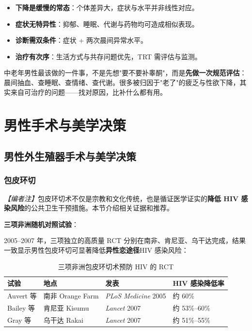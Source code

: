 \documentclass[12pt,a4paper,twoside]{ctexbook}
\newcommand{\keyword}[1]{\textbf{#1}}
\begin{document}
\begin{itemize}
  \item \keyword{下降是缓慢的常态}：个体差异大，症状与水平并非线性对应。
  \item \keyword{症状无特异性}：抑郁、睡眠、代谢与药物均可造成相似表现。
  \item \keyword{诊断需双条件}：症状 + 两次晨间异常水平。
  \item \keyword{治疗有次序}：生活方式与共存问题优先，TRT 需评估与监测。
\end{itemize}

\begin{tcolorbox}[colback=pink!5!white,colframe=red!50!black,title=贴心小叮咛]
中老年男性最该做的一件事，不是先想"要不要补睾酮"，而是\keyword{先做一次规范评估}：晨间抽血、查睡眠、查情绪、查代谢。很多被归因于"老了"的疲乏与性欲下降，其实来自可治疗的问题——找对原因，比补什么都有用。
\end{tcolorbox}



\part{男性手术与美学决策}

\chapter{男性外生殖器手术与美学决策}

\section{包皮环切}

\label{subsec:circumcision_hiv}

\noindent\textit{【编者注】}包皮环切术不仅是宗教和文化传统，也是循证医学证实的\textbf{降低 HIV 感染风险}的公共卫生干预措施。本节介绍相关证据和推荐。

\vspace{0.5em}
\noindent\textbf{三项非洲随机对照试验}：

2005--2007 年，三项独立的高质量 RCT 分别在南非、肯尼亚、乌干达完成，结果一致显示男性包皮环切可显著降低\textbf{异性恋途径}HIV 感染风险：

\begin{table}[htbp]
\centering
\caption{三项非洲包皮环切术预防 HIV 的 RCT}
\label{tab:circumcision_hiv_rct}
\begin{tabularx}{\textwidth}{@{}llXX@{}}
    \toprule
    \textbf{试验} & \textbf{地点} & \textbf{发表} & \textbf{HIV 感染降低率} \\
    \midrule
    Auvert 等 & 南非 Orange Farm & \textit{PLoS Medicine} 2005 & 约 60\% \\
    Bailey 等 & 肯尼亚 Kisumu & \textit{Lancet} 2007 & 约 53\%--60\% \\
    Gray 等 & 乌干达 Rakai & \textit{Lancet} 2007 & 约 51\%--55\% \\
    \bottomrule
\end{tabularx}
\end{table}
\end{document}
